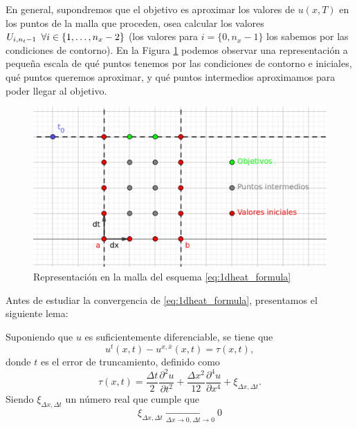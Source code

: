 En general, supondremos que el objetivo es aproximar los valores de $u(x,T)$ en los puntos de la malla que proceden, osea calcular los valores $U_{i,n_t-1} \hspace{5px} \forall i\in\{1,\dots,n_x-2\}$ (los valores para $i=\{0,n_x-1\}$ los sabemos por las condiciones de contorno). En la Figura \ref{fig:1d_grid} podemos observar una representación a pequeña escala de qué puntos tenemos por las condiciones de contorno e iniciales, qué puntos queremos aproximar, y qué puntos intermedios aproximamos para poder llegar al objetivo.


\begin{figure}[h]
	\centering
	\includegraphics[scale=0.25]{./Imagenes/Bitmap/1dheatpoints.png}
	\caption{Representación en la malla del esquema \eqref{eq:1dheat_formula}}
	\label{fig:1d_grid}
\end{figure}

Antes de estudiar la convergencia de \eqref{eq:1dheat_formula}, presentamos el siguiente lema:

\begin{lema}
	Suponiendo que $u$ es suficientemente diferenciable, se tiene que
	\begin{equation}
		\label{eq:lema1_eq1}
		u^t(x,t)-u^{x,\bar{x}}(x,t) = \tau(x,t),
	\end{equation}
	donde $t$ es el error de truncamiento, definido como
	\begin{equation}
		\label{eq:lema1_eq2}
		\tau(x,t) = \frac{\Delta t}{2}\frac{\partial^2 u}{\partial t^2} + \frac{\Delta x^2}{12}\frac{\partial^4u}{\partial x^4} + \xi_{\Delta x, \Delta t}.
	\end{equation}
	Siendo $\xi_{\Delta x, \Delta t}$ un número real que cumple que
	\begin{equation}
		\xi_{\Delta x, \Delta t} \xrightarrow[\Delta x \rightarrow 0, \Delta t\rightarrow 0]{} 0 
	\end{equation}
	
\end{lema}

